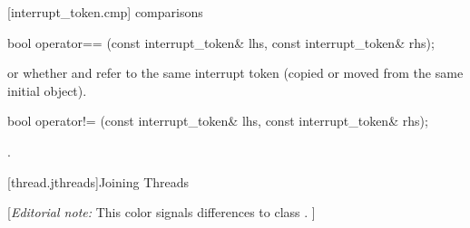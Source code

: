{%
[interrupt_token.cmp]{ comparisons}

%
\begin{itemdecl}
bool operator== (const interrupt_token& lhs, const interrupt_token& rhs);
\end{itemdecl}
\begin{itemdescr}
  \pnum\returns {} or
                whether  and  refer to the
                same interrupt token
                (copied or moved from the same initial object).
\end{itemdescr}

%
\begin{itemdecl}
bool operator!= (const interrupt_token& lhs, const interrupt_token& rhs);
\end{itemdecl}
\begin{itemdescr}
  \pnum\returns {}.
\end{itemdescr}


\clearpage

[thread.jthreads]{Joining Threads}

}%
[{\itshape{}Editorial note:} 
{\color{insertnote}This color signals differences to class .} ]
